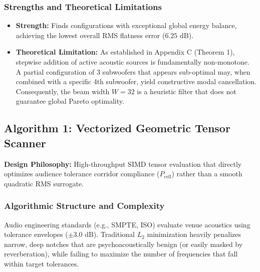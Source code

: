 \documentclass[11pt,a4paper,titlepage]{article}
\begin{document}
\subsubsection{Strengths and Theoretical Limitations}
\begin{itemize}
    \item \textbf{Strength:} Finds configurations with exceptional global energy balance, achieving the lowest overall RMS flatness error ($6.25\text{ dB}$).
    \item \textbf{Theoretical Limitation:} As established in Appendix C (Theorem 1), stepwise addition of active acoustic sources is fundamentally non-monotone. A partial configuration of 3 subwoofers that appears sub-optimal may, when combined with a specific 4th subwoofer, yield constructive modal cancellation. Consequently, the beam width $W=32$ is a heuristic filter that does not guarantee global Pareto optimality.
\end{itemize}

\subsection{Algorithm 1: Vectorized Geometric Tensor Scanner}
\textbf{Design Philosophy:} High-throughput SIMD tensor evaluation that directly optimizes audience tolerance corridor compliance ($P_{\text{cell}}$) rather than a smooth quadratic RMS surrogate.

\subsubsection{Algorithmic Structure and Complexity}
Audio engineering standards (e.g., SMPTE, ISO) evaluate venue acoustics using tolerance envelopes ($\pm 3.0\text{ dB}$). Traditional $L_2$ minimization heavily penalizes narrow, deep notches that are psychoacoustically benign (or easily masked by reverberation), while failing to maximize the number of frequencies that fall within target tolerances.
\end{document}
